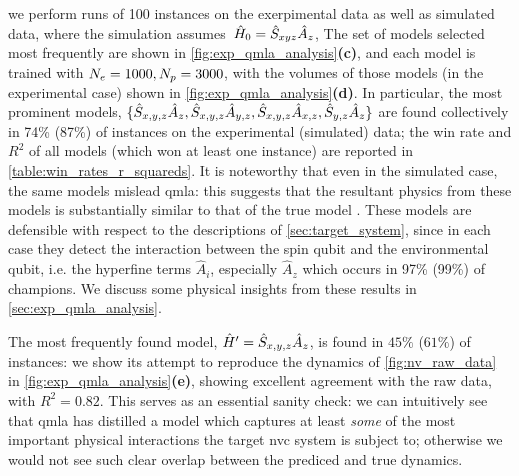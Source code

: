     we perform \glspl{run} of 100 \glspl{instance} on the exerpimental data as well as simulated data,
    where the simulation assumes\footnotemark \ $\hat{H}_0 = \hat{S}_{xyz} \hat{A}_z$, 
    The set of models selected most frequently are shown in \cref{fig:exp_qmla_analysis}\textbf{(c)},
    and each model is trained with $N_e=1000, N_p=3000$,
    with the \glspl{volume} of those models (in the experimental case) shown in  \cref{fig:exp_qmla_analysis}\textbf{(d)}.
In particular, the most prominent models, $\{ \hat{S}_{x,y,z}\hat{A}_{z}, \hat{S}_{x,y,z}\hat{A}_{y,z}, \hat{S}_{x,y,z}\hat{A}_{x,z}, \hat{S}_{y,z}\hat{A}_{z} \}$ are found collectively in 74\% (87\%)
    of \glspl{instance} on the experimental (simulated) data;
    the  \gls{win rate}  and $R^2$ of all models (which won at least one instance) are reported in \cref{table:win_rates_r_squareds}. 
It is noteworthy that even in the simulated case, the same models mislead \gls{qmla}:
    this suggests that the resultant physics from these models is substantially similar to that of the  \gls{true model} \footnotemark. 
These models are defensible with respect to the descriptions of \cref{sec:target_system}, 
    since in each case they detect the interaction between the spin qubit and the environmental qubit, 
    i.e. the hyperfine terms $\hat{A}_i$, especially $\hat{A}_z$ which occurs in 97\% (99\%) of champions. 
We discuss some physical insights from these results in \cref{sec:exp_qmla_analysis}.   
\par 



The most frequently found model, $\hat{H}^{\prime} = \hat{S}_{x,y,z}\hat{A}_{z}$, is found in $45\%$ ($61\%$) of instances:
    we show its attempt to reproduce the dynamics of \cref{fig:nv_raw_data} in \cref{fig:exp_qmla_analysis}\textbf{(e)}, 
    showing excellent agreement with the raw data, with $R^2=0.82$. 
This serves as an essential sanity check: 
    we can intuitively see that \gls{qmla} has distilled a model which captures at least \emph{some} 
    of the most important physical interactions the target \gls{nvc} system is subject to; 
    otherwise we would not see such clear overlap between the prediced and true dynamics. 
\par 

